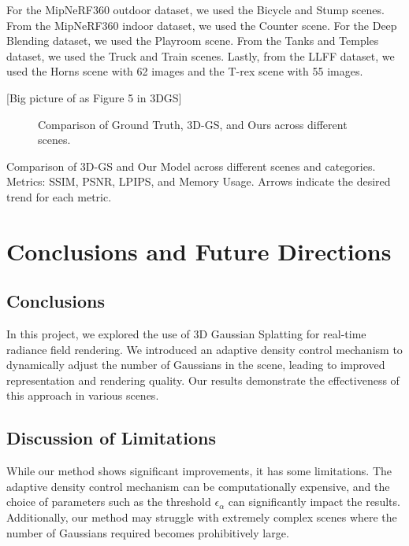\documentclass[11pt]{report}
\begin{document}
For the MipNeRF360 outdoor dataset, we used the Bicycle and Stump scenes. From the MipNeRF360 indoor dataset, we used the Counter scene. For the Deep Blending dataset, we used the Playroom scene. From the Tanks and Temples dataset, we used the Truck and Train scenes. Lastly, from the LLFF dataset, we used the Horns scene with 62 images and the T-rex scene with 55 images.

[Big picture of as Figure 5 in 3DGS]

\begin{figure}[h]
    \centering
    
    \caption{Comparison of Ground Truth, 3D-GS, and Ours across different scenes.}
    \label{fig:comparison}
\end{figure}

\begin{table}[h!]
    \centering
    
    \caption{Comparison of 3D-GS and Our Model across different scenes and categories. Metrics: SSIM, PSNR, LPIPS, and Memory Usage. Arrows indicate the desired trend for each metric.}
    \label{tab:comparison}
    \end{table}

\chapter{Conclusions and Future Directions}

\section{Conclusions}
In this project, we explored the use of 3D Gaussian Splatting for real-time radiance field rendering. We introduced an adaptive density control mechanism to dynamically adjust the number of Gaussians in the scene, leading to improved representation and rendering quality. Our results demonstrate the effectiveness of this approach in various scenes.

\section{Discussion of Limitations}
While our method shows significant improvements, it has some limitations. The adaptive density control mechanism can be computationally expensive, and the choice of parameters such as the threshold $\epsilon_\alpha$ can significantly impact the results. Additionally, our method may struggle with extremely complex scenes where the number of Gaussians required becomes prohibitively large.
\end{document}
